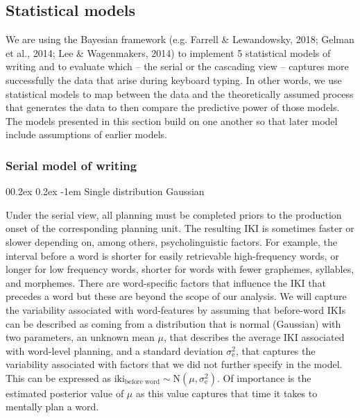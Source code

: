 \documentclass[
  english,
  man,floatsintext]{apa7}
\makeatletter
\let\oldparagraph\paragraph
\renewcommand{\paragraph}[1]{\oldparagraph{#1}\mbox{}}
\renewcommand{\paragraph}{\@startsection{paragraph}{4}{\parindent}%
  {0\baselineskip \@plus 0.2ex \@minus 0.2ex}%
  {-1em}%
  {\normalfont\normalsize\bfseries\itshape\typesectitle}}
\makeatother
\begin{document}
\clearpage
\makeatletter
\efloat@restorefloats
\makeatother


\begin{appendix}
\section{}
\hypertarget{statistical-models}{%
\subsection{Statistical models}\label{statistical-models}}

We are using the Bayesian framework (e.g. Farrell \& Lewandowsky, 2018;
Gelman et al., 2014; Lee \& Wagenmakers, 2014) to implement 5
statistical models of writing and to evaluate which -- the serial or the
cascading view -- captures more successfully the data that arise during
keyboard typing. In other words, we use statistical models to map
between the data and the theoretically assumed process that generates
the data to then compare the predictive power of those models. The
models presented in this section build on one another so that later
model include assumptions of earlier models.

\hypertarget{serial-model-of-writing}{%
\subsubsection{Serial model of writing}\label{serial-model-of-writing}}

\hypertarget{single-distribution-gaussian}{%
\paragraph{Single distribution
Gaussian}\label{single-distribution-gaussian}}

Under the serial view, all planning must be completed priors to the
production onset of the corresponding planning unit. The resulting IKI
is sometimes faster or slower depending on, among others,
psycholinguistic factors. For example, the interval before a word is
shorter for easily retrievable high-frequency words, or longer for low
frequency words, shorter for words with fewer graphemes, syllables, and
morphemes. There are word-specific factors that influence the IKI that
precedes a word but these are beyond the scope of our analysis. We will
capture the variability associated with word-features by assuming that
before-word IKIs can be described as coming from a distribution that is
normal (Gaussian) with two parameters, an unknown mean \(\mu\), that
describes the average IKI associated with word-level planning, and a
standard deviation \(\sigma_\text{e}^2\), that captures the variability
associated with factors that we did not further specify in the model.
This can be expressed as
\(\text{iki}_\text{before word} \sim \text{N}(\mu, \sigma_\text{e}^2)\).
Of importance is the estimated posterior value of \(\mu\) as this value
captures that time it takes to mentally plan a word.


\end{appendix}
\end{document}
